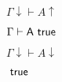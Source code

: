 \documentclass[10pt]{book}
\begin{document}
\begin{mdSnippets}
\begin{mdInlineSnippet}[5767cc7b10874497f07f18da8d15fdd4]%
$\Gamma\downarrow \vdash A\uparrow$\end{mdInlineSnippet}%
\begin{mdInlineSnippet}[dbceffeb0c56c6bc70dc530c4c61cb14]%
$\Gamma \vdash {\sf A \ true}$\end{mdInlineSnippet}%
\begin{mdInlineSnippet}[ef5cdf474c23168737a8ee9d04526e70]%
$\Gamma\downarrow\vdash A\downarrow $\end{mdInlineSnippet}%
\begin{mdInlineSnippet}[3fbc2702e7a2052c63d8db66ee4895a4]%
${\sf \ true}$\end{mdInlineSnippet}%

\end{mdSnippets}
\end{document}
